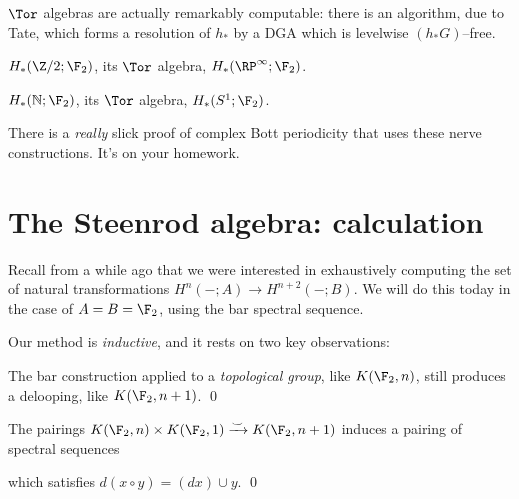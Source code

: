 $\Tor$ algebras are actually remarkably computable: there is an algorithm, due to Tate, which forms a resolution of $h_*$ by a DGA which is levelwise $(h_* G)$--free.

\begin{example}
$H_*(\Z/2; \F_2)$, its $\Tor$ algebra, $H_*(\RP^\infty; \F_2)$.
\end{example}

\begin{example}
$H_*(\mathbb N; \F_2)$, its $\Tor$ algebra, $H_*(S^1; \F_2)$.
\end{example}

\begin{remark}
There is a \emph{really} slick proof of complex Bott periodicity that uses these nerve constructions.  It's on your homework.
\end{remark}




\section{The Steenrod algebra: calculation}

Recall from a while ago that we were interested in exhaustively computing the set of natural transformations $H^n(-; A) \to H^{n+2}(-; B)$.  We will do this today in the case of $A = B = \F_2$, using the bar spectral sequence.

Our method is \emph{inductive}, and it rests on two key observations:
\begin{lemma}
The bar construction applied to a \emph{topological group}, like $K(\F_2, n)$, still produces a delooping, like $K(\F_2, n+1)$. \qed
\end{lemma}

\begin{lemma}
The pairings $K(\F_2, n) \times K(\F_2, 1) \xrightarrow\smile K(\F_2, n+1)$ induces a pairing of spectral sequences
\begin{center}
\end{center}
which satisfies $d(x \circ y) = (dx) \cup y$.  \qed
\end{lemma}

